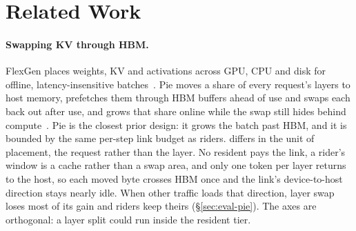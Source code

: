 
\section{Related Work}\label{sec:related}

\paragraph{Swapping KV through HBM.} FlexGen places weights, KV and
activations across GPU, CPU and disk for offline, latency-insensitive
batches~\cite{flexgen}. Pie moves a share of every request's layers to host
memory, prefetches them through HBM buffers ahead of use and swaps each back
out after use, and grows that share online while the swap still hides behind
compute~\cite{pie}. Pie is the closest prior design: it grows the batch past
HBM, and it is bounded by the same per-step link budget as riders.
\sysname{} differs in the unit of placement, the request rather than the
layer. No resident pays the link, a rider's window is a cache rather than a
swap area, and only one token per layer returns to the host, so each moved
byte crosses HBM once and the link's device-to-host direction stays nearly
idle. When other traffic loads that direction, layer swap loses most of its
gain and riders keep theirs (\S\ref{sec:eval-pie}). The axes are orthogonal: a
layer split could run inside the resident tier.

